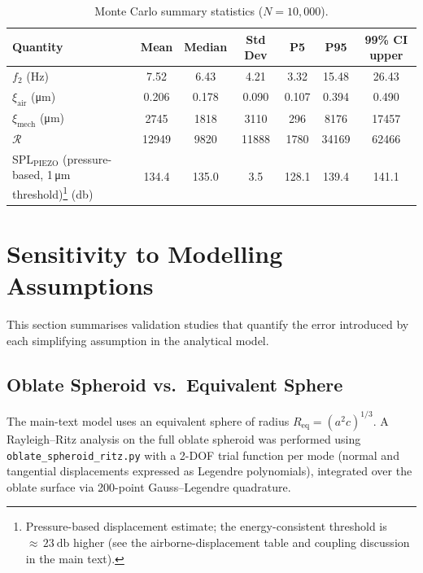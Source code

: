\documentclass[12pt]{article}
\begin{document}
\begin{table}[htbp]
\centering
\caption{Monte Carlo summary statistics ($N = 10{,}000$).}
\label{tab:mc_summary}
\begin{tabular}{@{}lSSSSSS@{}}
\toprule
{Quantity} & {Mean} & {Median} & {Std Dev} & {P5} & {P95} & {99\% CI upper} \\
\midrule
$f_{2}$ (\si{\hertz})
  & 7.52 & 6.43 & 4.21 & 3.32 & 15.48 & 26.43 \\
$\xi_{\mathrm{air}}$ (\si{\micro\metre})
  & 0.206 & 0.178 & 0.090 & 0.107 & 0.394 & 0.490 \\
$\xi_{\mathrm{mech}}$ (\si{\micro\metre})
  & 2745 & 1818 & 3110 & 296 & 8176 & 17457 \\
$\mathcal{R}$
  & 12949 & 9820 & 11888 & 1780 & 34169 & 62466 \\
SPL$_{\mathrm{PIEZO}}$ (pressure-based, 1\,\si{\micro\metre} threshold)\footnote{Pressure-based displacement
  estimate; the energy-consistent threshold is ${\approx}\,\SI{23}{\decibel}$
  higher (see the airborne-displacement table and coupling discussion in the
  main text).} (\si{\decibel})
  & 134.4 & 135.0 & 3.5 & 128.1 & 139.4 & 141.1 \\
\bottomrule
\end{tabular}
\end{table}


\section{Sensitivity to Modelling Assumptions}
\label{sec:sensitivity}

This section summarises validation studies that quantify the error introduced
by each simplifying assumption in the analytical model.

\subsection{Oblate Spheroid vs.\ Equivalent Sphere}
\label{sec:oblate}

The main-text model uses an equivalent sphere of radius
$R_{\mathrm{eq}} = (a^{2}c)^{1/3}$.  A Rayleigh--Ritz analysis on the full
oblate spheroid was performed using
\texttt{oblate\_spheroid\_ritz.py} with a 2-DOF trial function per mode
(normal and tangential displacements expressed as Legendre polynomials),
integrated over the oblate surface via 200-point Gauss--Legendre quadrature.
\end{document}
